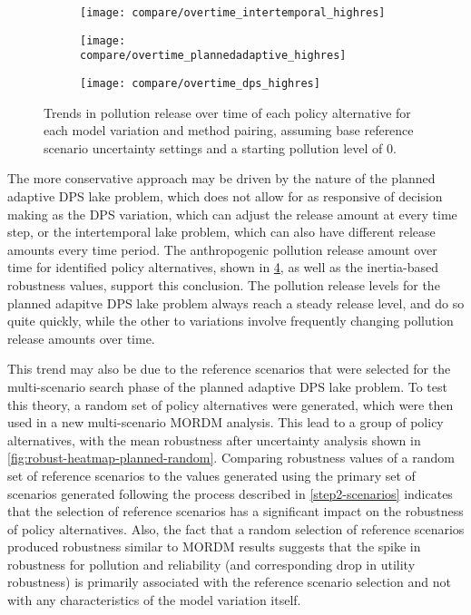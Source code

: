     \begin{figure}[H]
        \begin{subfigure}[b]{\textwidth}
            \texttt{[image: compare/overtime\_intertemporal\_highres]}
            \label{fig:intertemporal-overtime}
        \end{subfigure}
        \begin{subfigure}[b]{\textwidth}
            \texttt{[image: compare/overtime\_plannedadaptive\_highres]}
            \label{fig:planned-overtime}
        \end{subfigure}
        \begin{subfigure}[b]{\textwidth}
            \texttt{[image: compare/overtime\_dps\_highres]}
            \label{fig:dps-overtime}
        \end{subfigure}
        
        \caption[Trends in pollution release over time for all pairings]{Trends in pollution release over time of each policy alternative for each model variation and method pairing, assuming base reference scenario uncertainty settings and a starting pollution level of 0.}
        \label{fig:pollution-release-overtime}
    \end{figure}

    The more conservative approach may be driven by the nature of the planned adaptive DPS lake problem, which does not allow for as responsive of decision making as the DPS variation, which can adjust the release amount at every time step, or the intertemporal lake problem, which can also have different release amounts every time period. The anthropogenic pollution release amount over time for identified policy alternatives, shown in \cref{fig:pollution-release-overtime}, as well as the inertia-based robustness values, support this conclusion. The pollution release levels for the planned adapitve DPS lake problem always reach a steady release level, and do so quite quickly, while the other to variations involve frequently changing pollution release amounts over time.

    This trend may also be due to the reference scenarios that were selected for the multi-scenario search phase of the planned adaptive DPS lake problem. To test this theory, a random set of policy alternatives were generated, which were then used in a new multi-scenario MORDM analysis. This lead to a group of policy alternatives, with the mean robustness after uncertainty analysis shown in \cref{fig:robust-heatmap-planned-random}. Comparing robustness values of a random set of reference scenarios to the values generated using the primary set of scenarios generated following the process described in \cref{step2-scenarios} indicates that the selection of reference scenarios has a significant impact on the robustness of policy alternatives. Also, the fact that a random selection of reference scenarios produced robustness similar to MORDM results suggests that the spike in robustness for pollution and reliability (and corresponding drop in utility robustness) is primarily associated with the reference scenario selection and not with any characteristics of the model variation itself. 
    
